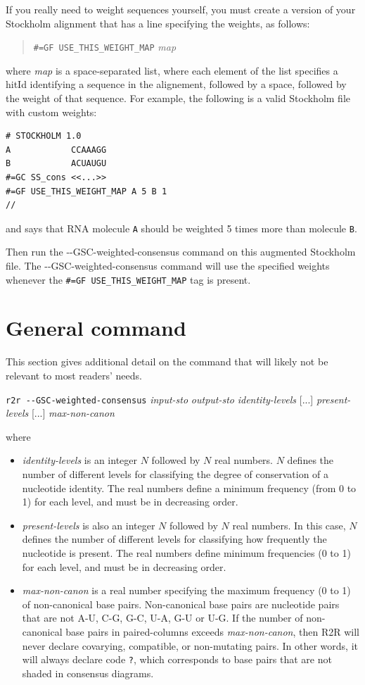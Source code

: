 \documentclass[letterpaper,12pt]{report}
\newcommand{\example}[1]{
\begin{quote}
{\raggedright
#1
}
\end{quote}
}
\begin{document}
If you really need to weight sequences yourself, you must create a version of your Stockholm alignment that has a line specifying the weights, as follows:
\example{
{\tt \#=GF USE\_THIS\_WEIGHT\_MAP} {\it map}
}
where {\it map} is a space-separated list, where each element of the list specifies a hitId identifying a sequence in the alignement,
followed by a space, followed by the weight of that sequence.  For example, the following is a valid Stockholm file with custom weights:
\begin{verbatim}
# STOCKHOLM 1.0
A            CCAAAGG
B            ACUAUGU
#=GC SS_cons <<...>>
#=GF USE_THIS_WEIGHT_MAP A 5 B 1
//
\end{verbatim}
and says that RNA molecule {\tt A} should be weighted 5 times more than molecule {\tt B}.

Then run the {-{}-GSC-weighted-consensus} command on this augmented Stockholm file.
The {-{}-GSC-weighted-consensus} command will use the specified weights whenever
the {\tt \#=GF USE\_THIS\_WEIGHT\_MAP} tag is present.

\section{General command}
\label{sec:gscgeneral}

This section gives additional detail on the command that will likely not be relevant to most readers' needs.

{\tt r2r -{}-GSC-weighted-consensus} {\it input-sto} {\it output-sto} {\it identity-levels} [...] {\it present-levels} [...] {\it max-non-canon}

where
\begin{itemize}
\item {\it identity-levels} is an integer $N$ followed by $N$ real numbers.  $N$ defines the number of different levels for classifying the degree of conservation of a nucleotide identity.  The real numbers define a minimum frequency (from 0 to 1) for each level, and must be in decreasing order.
\item {\it present-levels} is also an integer $N$ followed by $N$ real numbers.  In this case, $N$ defines the number of different levels for classifying how frequently the nucleotide is present.  The real numbers define minimum frequencies (0 to 1) for each level, and must be in decreasing order.
\item {\it max-non-canon} is a real number specifying the maximum frequency (0 to 1) of non-canonical base pairs.  Non-canonical base pairs are nucleotide pairs that are not A-U, C-G, G-C, U-A, G-U or U-G.  If the number of non-canonical base pairs in paired-columns exceeds {\it max-non-canon}, then R2R will never declare covarying, compatible, or non-mutating pairs.  In other words, it will always declare code {\tt ?}, which corresponds to base pairs that are not shaded in consensus diagrams.
\end{itemize}
\end{document}
